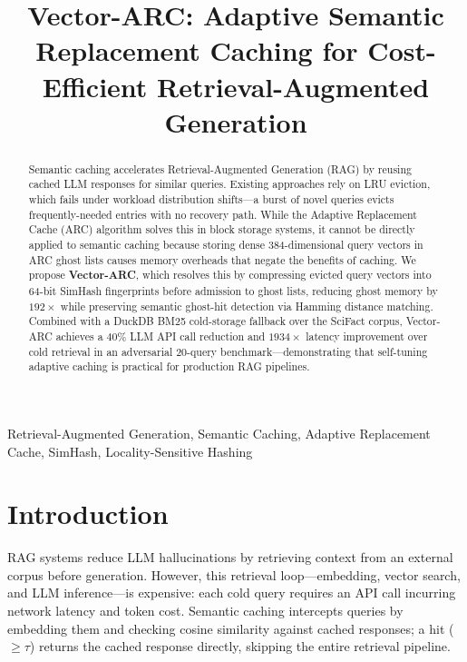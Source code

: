 \documentclass[conference,10pt]{IEEEtran}
\begin{document}
\title{Vector-ARC: Adaptive Semantic Replacement Caching for Cost-Efficient Retrieval-Augmented Generation}

\author{}

\maketitle

\begin{abstract}
Semantic caching accelerates Retrieval-Augmented Generation (RAG) by reusing cached LLM responses for similar queries. Existing approaches rely on LRU eviction, which fails under workload distribution shifts—a burst of novel queries evicts frequently-needed entries with no recovery path. While the Adaptive Replacement Cache (ARC) algorithm solves this in block storage systems, it cannot be directly applied to semantic caching because storing dense 384-dimensional query vectors in ARC ghost lists causes memory overheads that negate the benefits of caching. We propose \textbf{Vector-ARC}, which resolves this by compressing evicted query vectors into 64-bit SimHash fingerprints before admission to ghost lists, reducing ghost memory by $192\times$ while preserving semantic ghost-hit detection via Hamming distance matching. Combined with a DuckDB BM25 cold-storage fallback over the SciFact corpus, Vector-ARC achieves a $40\%$ LLM API call reduction and $1934\times$ latency improvement over cold retrieval in an adversarial 20-query benchmark—demonstrating that self-tuning adaptive caching is practical for production RAG pipelines.
\end{abstract}

\begin{IEEEkeywords}
Retrieval-Augmented Generation, Semantic Caching, Adaptive Replacement Cache, SimHash, Locality-Sensitive Hashing
\end{IEEEkeywords}

\section{Introduction}

RAG systems reduce LLM hallucinations by retrieving context from an external corpus before generation. However, this retrieval loop—embedding, vector search, and LLM inference—is expensive: each cold query requires an API call incurring network latency and token cost. Semantic caching intercepts queries by embedding them and checking cosine similarity against cached responses; a hit ($\ge\tau$) returns the cached response directly, skipping the entire retrieval pipeline.
\end{document}
